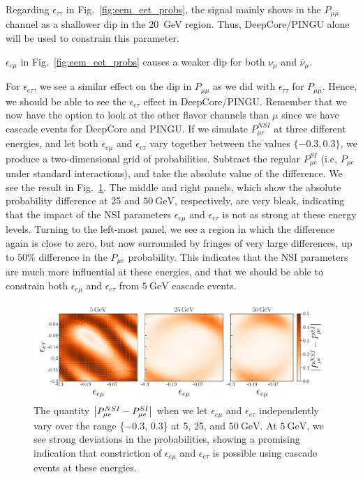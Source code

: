 \documentclass{revtex4-2}
\newcommand{\eet}{\epsilon_{e\tau}}
\newcommand{\eem}{\epsilon_{e\mu}}
\newcommand{\ett}{\ensuremath{\epsilon_{\tau\tau}}}
\newcommand{\nm}{\nu_\mu}
\newcommand{\anm}{\bar\nu_\mu}
\newcommand{\Pme}{P_{\mu  e}}
\newcommand{\Pmm}{P_{\mu\mu}}
\newcommand{\Pamam}{P_{\bar{\mu}  \bar{\mu}}}
\begin{document}
Regarding $\ett$ in Fig.~\ref{fig:eem_eet_probs}, the signal mainly shows in the $\Pamam$ channel as
a shallower dip in the \SI{20}{\GeV} region. Thus, DeepCore/PINGU alone will be used to constrain this parameter.

$\eem$ in Fig.~\ref{fig:eem_eet_probs} causes a weaker dip for both $\nm$ and $\anm$. 


For $\eet$, we see a similar effect on the dip in $\Pmm$ as we did with $\ett$ for $\Pamam$. Hence, we should be able to 
see the $\eet$ effect in DeepCore/PINGU. Remember that we now have the option to look at the other flavor channels than $\mu$ since we 
have cascade events for DeepCore and PINGU. If we simulate 
$\Pme^{NSI}$ at three different energies, and let both $\eem$ and $\eet$ vary together between the values $\{-0.3,0.3\}$, we produce a two-dimensional grid of probabilities.
Subtract the regular $\Pme^{SI}$ (i.e, $\Pme$ under standard interactions), and take the absolute value of the difference. We see the result in Fig.~\ref{fig:eem_eet_prob}. 
The middle and right panels, which show the absolute probability difference at \si{25} and $\SI{50}{\GeV}$, respectively, are very bleak,
indicating that the impact of the NSI parameters $\eem$ and $\eet$ is not as strong at these energy levels. Turning to the left-most panel,
we see a region in which the difference again is close to zero, but now surrounded by fringes of very large differences, up to $50\%$ difference 
in the $\Pme$ probability. This indicates that the NSI parameters are much more influential at these energies, and that we should be able to 
constrain both $\eem$ and $\eet$ from $\SI{5}{\GeV}$ cascade events.

\begin{figure}
    \centering
    \includegraphics[width=0.99\textwidth]{figures/eem_eet_prob.pdf}
    \caption{The quantity $\abs{P_{\mu e}^{NSI} - P_{\mu e}^{SI}}$ when we let $\eem$ and $\eet$ independently vary over
    the range \{$-0.3$, $0.3$\} at \si{5}, \si{25}, and $\SI{50}{\GeV}$. At $\SI{5}{\GeV}$, we see strong deviations in the probabilities, showing
    a promising indication that constriction of $\eem$ and $\eet$ is possible using cascade events at these energies.}\label{fig:eem_eet_prob}
\end{figure}
\end{document}
